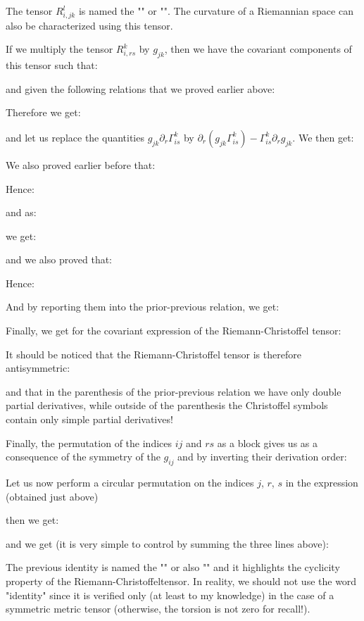	The tensor $R_{i,jk}^l$ is named the "" or "". The curvature of a Riemannian space can also be characterized using this tensor.

	If we multiply the tensor $R_{i,rs}^k$ by $g_{jk}$, then we have the covariant components of this tensor such that:
	
	and given the following relations that we proved earlier above:
	
	Therefore we get:
	
	and let us replace the quantities $g_{jk}\partial_r\Gamma_{is}^k$ by $\partial_r\left(g_{jk}\Gamma_{is}^k\right)-\Gamma_{is}^k\partial_r g_{jk}$. We then get:
	
	We also proved earlier before that:
	
	Hence:
	
	and as:
	
	we get:
	
	and we also proved that:
	
	Hence:
	
	And by reporting them into the prior-previous relation, we get:
	
	Finally, we get for the covariant expression of the Riemann-Christoffel tensor:
	
	It should be noticed that the Riemann-Christoffel tensor is therefore antisymmetric:
	
	and that in the parenthesis of the prior-previous relation we have only double partial derivatives, while outside of the parenthesis the Christoffel symbols contain only simple partial derivatives!

	Finally, the permutation of the indices $ij$ and $rs$ as a block gives us as a consequence of the symmetry of the $g_{ij}$ and by inverting their derivation order:
	
	Let us now perform a circular permutation on the indices $j$, $r$, $s$ in the expression (obtained just above)
	
	then we get:
	
	and we get (it is very simple to control by summing the three lines above):
	
	The previous identity is named the "\label{first bianchi identity}" or also "" and it highlights the cyclicity property of the  Riemann-Christoffeltensor. In reality, we should not use the word "identity" since it is verified only (at least to my knowledge) in the case of a symmetric metric tensor (otherwise, the torsion is not zero for recall!).

